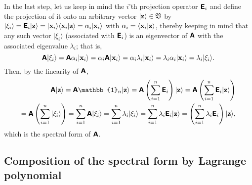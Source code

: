 {In the last step, let us keep in mind the $i$'th projection operator $\textsf{\textbf{E}}_i$
and define the projection of it onto
an arbitrary vector $\vert {\bf z}\rangle \in \frak V$ by
$
\vert {\xi}_i \rangle =  \textsf{\textbf{E}}_i  \vert  {\bf z} \rangle
=
\vert  {\bf x}_i \rangle \langle  {\bf x}_i   \vert  {\bf z} \rangle
= \alpha_i \vert  {\bf x}_i \rangle
$ with $
\alpha_i = \langle  {\bf x}_i   \vert  {\bf z} \rangle
$,
thereby keeping in mind that any such vector $\vert  {\xi}_i \rangle$ (associated with $\textsf{\textbf{E}}_i$)
is an eigenvector of $\textsf{\textbf{A}}$  with the associated eigenvalue $\lambda_i$; that is,
\begin{equation}
\textsf{\textbf{A}} \vert {\xi}_i  \rangle
 = \textsf{\textbf{A}}\alpha_i \vert  {\bf x}_i \rangle
 = \alpha_i \textsf{\textbf{A}} \vert  {\bf x}_i \rangle
 = \alpha_i \lambda_i \vert  {\bf x}_i  \rangle
 = \lambda_i \alpha_i \vert  {\bf x}_i  \rangle
= \lambda_i \vert {\xi}_i\rangle .
\end{equation}
Then, by the linearity of $\textsf{\textbf{A}}$,
\begin{equation}
\begin{split}
\textsf{\textbf{A}} \vert {\bf z} \rangle =
\textsf{\textbf{A}} \mathbb{1}_n \vert {\bf z} \rangle=
\textsf{\textbf{A}} \left(\sum_{i=1}^n \textsf{\textbf{E}}_i\right) \vert {\bf z}\rangle  =
\textsf{\textbf{A}} \left(\sum_{i=1}^n \textsf{\textbf{E}}_i \vert {\bf z}\rangle \right)      \\
=
\textsf{\textbf{A}} \left(\sum_{i=1}^n \vert {\xi}_i\rangle \right) =
 \sum_{i=1}^n \textsf{\textbf{A}} \vert {\xi}_i\rangle   =
 \sum_{i=1}^n \lambda_i \vert {\xi}_i \rangle   =
 \sum_{i=1}^n \lambda_i \textsf{\textbf{E}}_i   \vert {\bf z}\rangle =
\left( \sum_{i=1}^n \lambda_i \textsf{\textbf{E}}_i \right) \vert {\bf z}\rangle ,
\end{split}
\end{equation}
which is the spectral form of $\textsf{\textbf{A}}$.
\eproof
}

\subsection{Composition of the spectral form by Lagrange polynomial}

